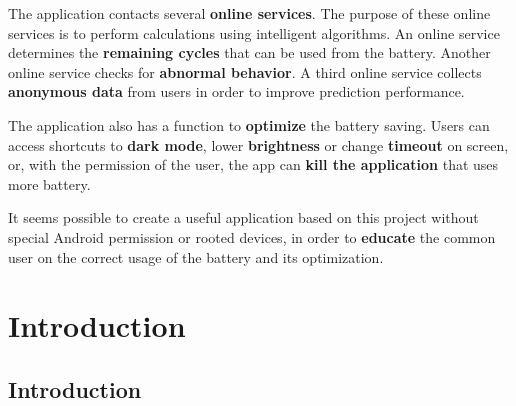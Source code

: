 \documentclass[12pt,a4paper]{report}
\begin{document}
The application contacts several \textbf{online services}. The purpose of these online services is to perform calculations using intelligent algorithms. An online service determines the \textbf{remaining cycles} that can be used from the battery. Another online service checks for \textbf{abnormal behavior}. A third online service collects \textbf{anonymous data} from users in order to improve prediction performance.

The application also has a function to \textbf{optimize} the battery saving. Users can access shortcuts to \textbf{dark mode}, lower \textbf{brightness} or change \textbf{timeout} on screen, or, with the permission of the user, the app can \textbf{kill the application} that uses more battery.

It seems possible to create a useful application based on this project without special Android permission or rooted devices, in order to \textbf{educate} the common user on the correct usage of the battery and its optimization.

\clearpage

\tableofcontents
\clearpage

\listoftables
{}

\listoffigures
{}
\clearpage

\setcounter{page}{1}
\chapter{Introduction}

\section{Introduction}
\end{document}
